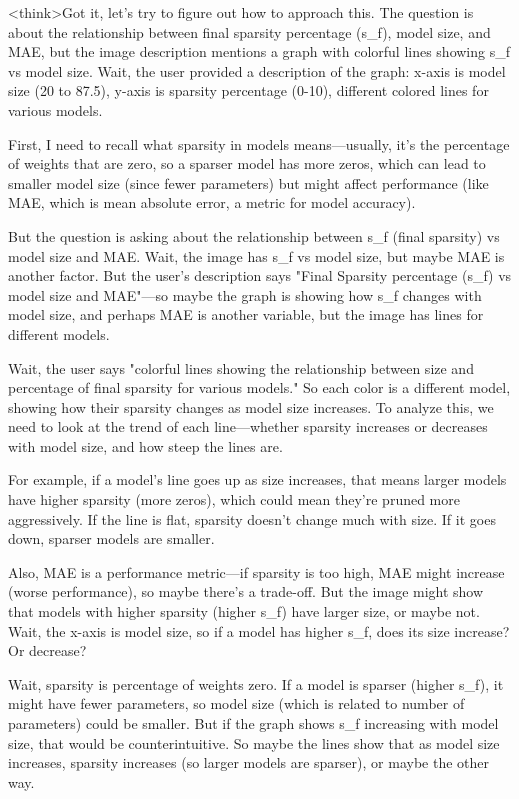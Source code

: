 <think>Got it, let's try to figure out how to approach this. The question is about the relationship between final sparsity percentage (s_f), model size, and MAE, but the image description mentions a graph with colorful lines showing s_f vs model size. Wait, the user provided a description of the graph: x-axis is model size (20 to 87.5), y-axis is sparsity percentage (0-10), different colored lines for various models. 

First, I need to recall what sparsity in models means—usually, it's the percentage of weights that are zero, so a sparser model has more zeros, which can lead to smaller model size (since fewer parameters) but might affect performance (like MAE, which is mean absolute error, a metric for model accuracy). 

But the question is asking about the relationship between s_f (final sparsity) vs model size and MAE. Wait, the image has s_f vs model size, but maybe MAE is another factor. But the user's description says "Final Sparsity percentage (s_f) vs model size and MAE"—so maybe the graph is showing how s_f changes with model size, and perhaps MAE is another variable, but the image has lines for different models. 

Wait, the user says "colorful lines showing the relationship between size and percentage of final sparsity for various models." So each color is a different model, showing how their sparsity changes as model size increases. To analyze this, we need to look at the trend of each line—whether sparsity increases or decreases with model size, and how steep the lines are. 

For example, if a model's line goes up as size increases, that means larger models have higher sparsity (more zeros), which could mean they're pruned more aggressively. If the line is flat, sparsity doesn't change much with size. If it goes down, sparser models are smaller. 

Also, MAE is a performance metric—if sparsity is too high, MAE might increase (worse performance), so maybe there's a trade-off. But the image might show that models with higher sparsity (higher s_f) have larger size, or maybe not. Wait, the x-axis is model size, so if a model has higher s_f, does its size increase? Or decrease? 

Wait, sparsity is percentage of weights zero. If a model is sparser (higher s_f), it might have fewer parameters, so model size (which is related to number of parameters) could be smaller. But if the graph shows s_f increasing with model size, that would be counterintuitive. So maybe the lines show that as model size increases, sparsity increases (so larger models are sparser), or maybe the other way. 

